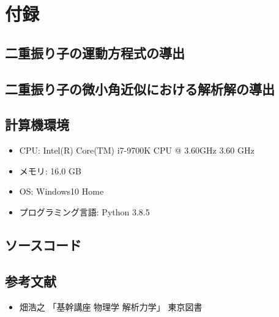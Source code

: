 \documentclass[a4paper,11pt]{jsarticle}
\begin{document}
\section{付録}
\subsection{二重振り子の運動方程式の導出} \label{ch:EL-eq}

\newpage
\subsection{二重振り子の微小角近似における解析解の導出} \label{ch:analytical}


\subsection{計算機環境}
\begin{itemize}
  \item CPU: Intel(R) Core(TM) i7-9700K CPU @ 3.60GHz   3.60 GHz
  \item メモリ: 16.0 GB
  \item OS: Windows10 Home
  \item プログラミング言語: Python 3.8.5
\end{itemize}
\newpage
\subsection{ソースコード}

\newpage

\newpage

\newpage

\newpage

\newpage

\newpage

\newpage
\subsection{参考文献}
\begin{itemize}
  \item 畑浩之 「基幹講座 物理学 解析力学」 東京図書
\end{itemize}
\end{document}
